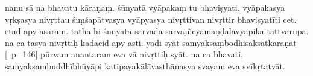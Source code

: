 \documentclass[12pt]{article}
\begin{document}
% 

nanu sā na\footnoteB{
	na] \EDD\ (\emd); deest \emph{in} \MS
} bhavatu kāraṇaṃ. śūnyatā vyāpakaṃ tu bhaviṣyati. vyāpakasya vṛkṣasya nivṛttau śiṃśapātvasya vyāpyasya nivṛttivan nivṛttir bhaviṣyatīti cet. etad apy asāram. tathā hi śūnyatā sarvadā sarvajñeyamaṇḍalavyāpikā tattvarūpā.\footnoteB{
	tattvarūpā] \EDD ; tatvarūpāḥ \MS
} na ca tasyā nivṛttiḥ kadācid apy asti. yadi syāt samyaksaṃbodhisākṣātkaraṇāt [\EDD\ p.\ 146] pūrvam anantaram eva vā nivṛttiḥ syāt. na ca bhavati, samyaksaṃbuddhībhūyāpi katipayakālāvasthānasya svayam eva svīkṛtatvāt.
\end{document}
